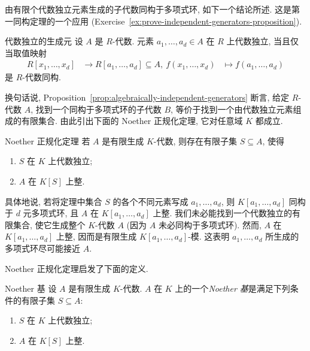 由有限个代数独立元素生成的子代数同构于多项式环, 如下一个结论所述. 这是第一同构定理的一个应用 (Exercise~\ref{ex:prove-independent-generators-proposition}).

\begin{Proposition}{代数独立的生成元}\leavevmode\label{prop:algebraically-independent-generators}
设 $A$ 是 $R$-代数. 元素 $a_{1},\ldots,a_{d}\in A$ 在 $R$ 上代数独立, 当且仅当取值映射
\[
  \begin{aligned}
    R[x_{1},\ldots,x_{d}]&\to R[a_{1},\ldots,a_{d}]\subseteq A,\
    f(x_{1},\ldots,x_{d})&\mapsto f(a_{1},\ldots,a_{d})
  \end{aligned}
\]
是 $R$-代数同构.
\end{Proposition}

换句话说, Proposition~\ref{prop:algebraically-independent-generators} 断言, 给定 $R$-代数 $A$, 找到一个同构于多项式环的子代数 $B$, 等价于找到一个由代数独立元素组成的有限集合. 由此引出下面的 Noether 正规化定理, 它对任意域 $K$ 都成立.

\begin{Theorem}{Noether 正规化定理}\leavevmode\label{thm:noether-normalization}
若 $A$ 是有限生成 $K$-代数, 则存在有限子集 $S\subseteq A$, 使得
\begin{enumerate}
  \item[(i)] $S$ 在 $K$ 上代数独立;
  \item[(ii)] $A$ 在 $K[S]$ 上整.
\end{enumerate}
\end{Theorem}

具体地说, 若将定理中集合 $S$ 的各个不同元素写成 $a_{1},\ldots,a_{d}$, 则 $K[a_{1},\ldots,a_{d}]$ 同构于 $d$ 元多项式环, 且 $A$ 在 $K[a_{1},\ldots,a_{d}]$ 上整. 我们未必能找到一个代数独立的有限集合, 使它生成整个 $K$-代数 $A$ (因为 $A$ 未必同构于多项式环). 然而, $A$ 在 $K[a_{1},\ldots,a_{d}]$ 上整, 因而是有限生成 $K[a_{1},\ldots,a_{d}]$-模. 这表明 $a_{1},\ldots,a_{d}$ 所生成的多项式环\textquotedbl{}尽可能接近 $A$\textquotedbl{}.

Noether 正规化定理启发了下面的定义.

\begin{Definition}{Noether 基}\leavevmode\label{def:noether-basis}
设 $A$ 是有限生成 $K$-代数. $A$ 在 $K$ 上的一个\emph{Noether 基}是满足下列条件的有限子集 $S\subseteq A$:
\begin{enumerate}
  \item[(i)] $S$ 在 $K$ 上代数独立;
  \item[(ii)] $A$ 在 $K[S]$ 上整.
\end{enumerate}
\end{Definition}

